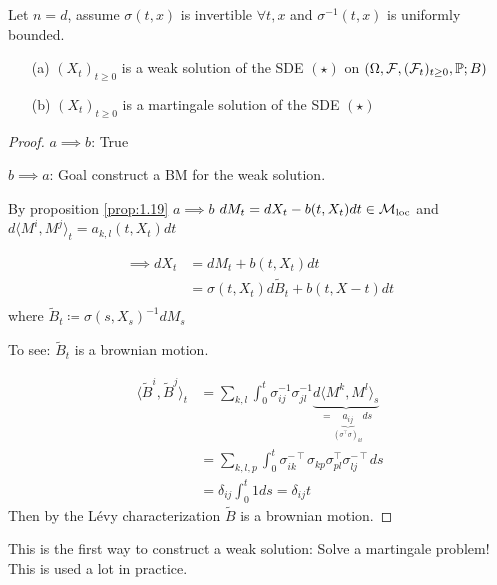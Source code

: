 \begin{theorem}\label{thm:1.20}
    Let $n=d$, %
    assume $\sigma(t,x)$ is invertible
    $\forall t,x$ and $\sigma^{-1}(t,x)$ is uniformly bounded. 
    \begin{enumerate}
        \item[(a)] $(X_t)_{t\geq 0}$ is a weak solution of the SDE $(\star)$ on $(\Omega,\mathcal{F},(\mathcal{F}_t)_{t\geq 0},\mathbb{P};B)$
        \item[(b)] $(X_t)_{t\geq 0}$ is a martingale solution of the SDE $(\star)$ 
    \end{enumerate}
\end{theorem}

\begin{proof}
    $a\implies b$: True 

    $b\implies a$: Goal construct a BM for the weak solution. 

    By proposition \ref{prop:1.19} $a\implies b$ $dM_t=dX_t-b(t,X_t)dt\in\mathcal{M}_{\text{loc}}$ and $d\langle M^i,M^j\rangle_t={a_{k,l}}(t,X_t)dt$

    \begin{align*}
        \implies dX_t&=dM_t+b(t,X_t)dt\\
        &=\sigma(t,X_t)d\tilde{B}_t+b(t,X-t)dt\\
    \end{align*}
    where $\tilde{B}_t\coloneqq \sigma(s,X_s)^{-1}dM_s$

    To see: $\tilde{B}_t$ is a brownian motion.

    \begin{align*}
        \langle \tilde{B}^i,\tilde{B}^j\rangle_t&=\sum_{k,l}\int_0^t\sigma_{ij}^{-1}\sigma_{jl}^{-1} \underbrace{d\langle M^k,M^l\rangle_s}_{=\underbrace{a_{ij}}_{(\sigma^\intercal \sigma)_{kl}}ds}\\
        &=\sum_{k,l,p}\int_0^t\sigma_{ik}^{-\intercal}\sigma_{kp}\sigma_{pl}^{\intercal}\sigma_{lj}^{-\intercal}ds\\
        &=\delta_{ij}\int_0^t 1 ds=\delta_{ij}t
    \end{align*}
    Then by the Lévy characterization $\tilde{B}$ is a brownian motion.
\end{proof}

\begin{aremark}
    This is the first way to construct a weak solution: Solve a martingale problem! This is used a lot in practice.
\end{aremark}

